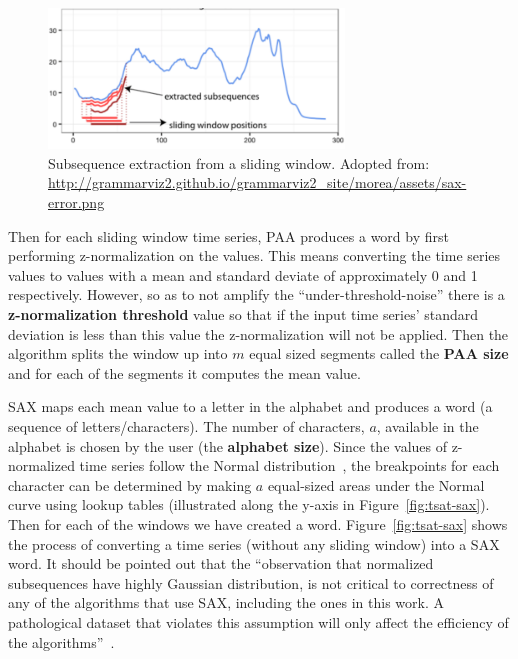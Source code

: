 \documentclass[titlepage, letterpaper, 12pt]{article}
\begin{document}
\begin{figure}[H]
	\centering
	\includegraphics[width=0.7\textwidth]{pictures/TSAT-slidingwindow}
	\caption{Subsequence extraction from a sliding window.  Adopted from:\\ \url{http://grammarviz2.github.io/grammarviz2_site/morea/assets/sax-error.png}}
	\label{fig:tsat-slidingwindow}
\end{figure}


Then for each sliding window time series, PAA produces a word by first performing z-normalization on the values.  This means converting the time series values to values with a mean and standard deviate of approximately 0 and 1 respectively.  However, so as to not amplify the ``under-threshold-noise'' there is a \textbf{z-normalization threshold} value so that if the input time series' standard deviation is less than this value the z-normalization will not be applied. Then the algorithm splits the window up into \(m\) equal sized segments called the \textbf{PAA size} and for each of the segments it computes the mean value.  

SAX maps each mean value to a letter in the alphabet and produces a word (a sequence of letters/characters).  The number of characters, \(a\), available in the alphabet is chosen by the user (the \textbf{alphabet size}).  Since the values of z-normalized time series follow the Normal distribution~\cite{lin2003symbolic}, the breakpoints for each character can be determined by making \(a\) equal-sized areas under the Normal curve using lookup tables (illustrated along the y-axis in Figure~\ref{fig:tsat-sax}). Then for each of the windows we have created a word.  Figure~\ref{fig:tsat-sax} shows the process of converting a time series (without any sliding window) into a SAX word.  It should be pointed out that the ``observation that normalized subsequences have highly Gaussian distribution, is not critical to correctness of any of the algorithms that use SAX, including the ones in this work. A pathological dataset that violates this assumption will only affect the efficiency of the algorithms''~\cite{keogh2004hot}.
\end{document}
